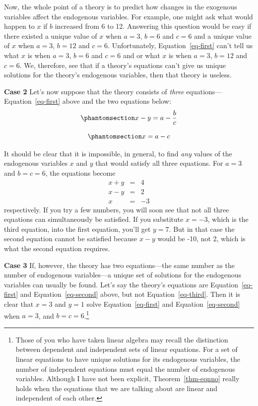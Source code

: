 \documentclass[
  letterpaper,
]{book}
\theoremstyle{plain}
\theoremstyle{remark}
\begin{document}
Now, the whole point of a theory is to predict how changes in the
exogenous variables affect the endogenous variables. For example, one
might ask what would happen to \(x\) if \(b\) increased from 6 to 12.
Answering this question would be easy if there existed a unique value of
\(x\) when \(a=3\), \(b=6\) and \(c=6\) and a unique value of \(x\) when
\(a=3\), \(b=12\) and \(c=6\). Unfortunately, Equation~\ref{eq-first}
can't tell us what \(x\) is when \(a = 3\), \(b = 6\) and \(c = 6\) and
or what \(x\) is when \(a = 3\), \(b = 12\) and \(c = 6\). We,
therefore, see that if a theory's equations can't give us unique
solutions for the theory's endogenous variables, then that theory is
useless.

\textbf{Case 2} Let's now suppose that the theory consists of
\emph{three} equations---Equation~\ref{eq-first} above and the two
equations below: \begin{equation}\phantomsection\label{eq-second}{
x - y = a - \frac{b}{c}
}\end{equation}

\begin{equation}\phantomsection\label{eq-third}{
x  = a -c
}\end{equation}

It should be clear that it is impossible, in general, to find \emph{any}
values of the endogenous variables \(x\) and \(y\) that would satisfy
all three equations. For \(a=3\) and \(b=c=6\), the equations become \[
\begin{eqnarray*}
x + y &=& 4\\
x - y &=& 2\\
x &=& -3
\end{eqnarray*}
\] respectively. If you try a few numbers, you will soon see that not
all three equations can simultaneously be satisfied. If you substitute
\(x = -3\), which is the third equation, into the first equation, you'll
get \(y = 7\). But in that case the second equation cannot be satisfied
because \(x - y\) would be -10, not 2, which is what the second equation
requires.

\textbf{Case 3} If, however, the theory has two equations---the same
number as the number of endogenous variables---a unique set of solutions
for the endogenous variables can usually be found. Let's say the
theory's equations are Equation~\ref{eq-first} and
Equation~\ref{eq-second} above, but not Equation~\ref{eq-third}. Then it
is clear that \(x = 3\) and \(y =1\) solve Equation~\ref{eq-first} and
Equation~\ref{eq-second} when \(a=3\), and \(b=c=6\).\footnote{Those of
  you who have taken linear algebra may recall the distinction between
  dependent and independent sets of linear equations. For a set of
  linear equations to have unique solutions for its endogenous
  variables, the number of independent equations must equal the number
  of endogenous variables. Although I have not been explicit,
  Theorem~\ref{thm-eqnno} really holds when the equations that we are
  talking about are linear and independent of each other.}
\end{document}
